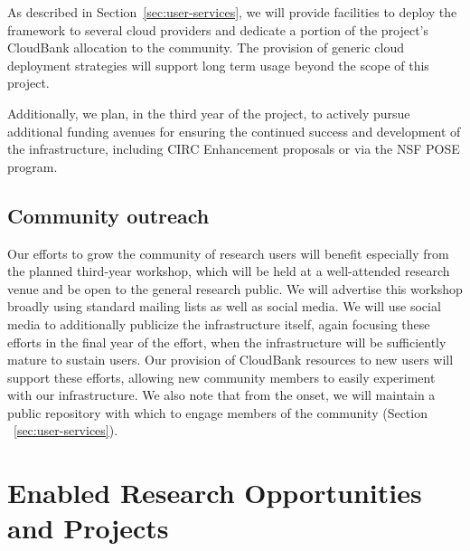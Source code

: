 As described in Section~\ref{sec:user-services}, we will provide facilities to
deploy the framework to several cloud providers and dedicate a portion of the
project's CloudBank allocation to the community.  The provision of generic cloud
deployment strategies will support long term usage beyond the scope of this
project.

Additionally, we plan, in the third year of the project, to actively pursue
additional funding avenues for ensuring the continued success and development of
the infrastructure, including CIRC Enhancement proposals or via the NSF POSE
program. 

\subsection{Community outreach}

Our efforts to grow the community of research users will benefit especially from
the planned third-year workshop, which will be held at a well-attended research
venue and be open to the general research public.  We will advertise this
workshop broadly using standard mailing lists as well as social media.  We will
use social media to additionally publicize the infrastructure itself, again
focusing these efforts in the final year of the effort, when the infrastructure
will be sufficiently mature to sustain users.  Our provision of CloudBank
resources to new users will support these efforts, allowing new community
members to easily experiment with our infrastructure.
We also note that from the onset, we will maintain a public repository 
with which to engage members of the community (Section ~\ref{sec:user-services}).


\section{Enabled Research Opportunities and Projects}

